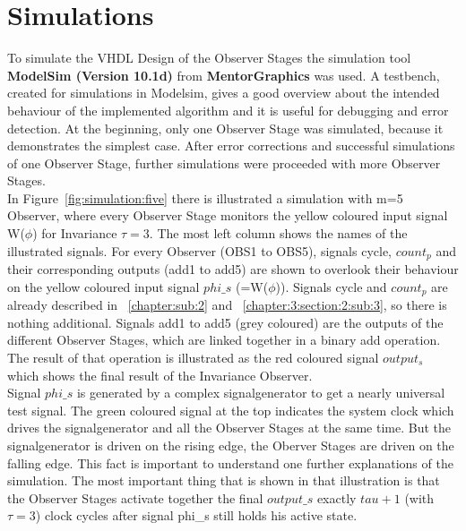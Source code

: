 
%



\section{Simulations}
\label{chapter:4:section:2}
To simulate the VHDL Design of the Observer Stages the simulation tool \textbf{ModelSim (Version 10.1d)} from \textbf{MentorGraphics} was used. 
A testbench, created for simulations in Modelsim, gives a good overview about the intended behaviour of the implemented algorithm and it is useful for debugging and error detection. 
At the beginning, only one Observer Stage was simulated, because it demonstrates the simplest case. 
After error corrections and successful simulations of one Observer Stage, further simulations were proceeded with more Observer Stages. \\
In Figure~\ref{fig:simulation:five} there is illustrated a simulation with m=5 Observer, where every Observer Stage monitors the yellow coloured input signal W($\phi$) for Invariance $\tau=3$. 
The most left column shows the names of the illustrated signals. 
For every Observer (OBS1 to OBS5), signals cycle, $count_p$ and their corresponding outputs (add1 to add5) are shown to overlook their behaviour on the yellow coloured input signal $phi\_s$ (=W($\phi$)). 
Signals cycle and $count_p$ are already described in ~\ref{chapter:sub:2} and ~\ref{chapter:3:section:2:sub:3}, so there is nothing additional. 
Signals add1 to add5 (grey coloured) are the outputs of the different Observer Stages, which are linked together in a binary add operation. 
The result of that operation is illustrated as the red coloured signal $output_s$ which shows the final result of the Invariance Observer. \\
Signal $phi\_s$ is generated by a complex signalgenerator to get a nearly universal test signal. The green coloured signal at the top indicates the system clock which drives the signalgenerator 
and all the Observer Stages at the same time. But the signalgenerator is driven on the rising edge, the Oberver Stages are driven on the falling edge. 
This fact is important to understand one further explanations of the simulation. 
The most important thing that is shown in that illustration is that the Observer Stages activate together the final $output\_s$ exactly $tau + 1$ (with $\tau = 3$) clock cycles after signal phi\_s still holds his active state. 
